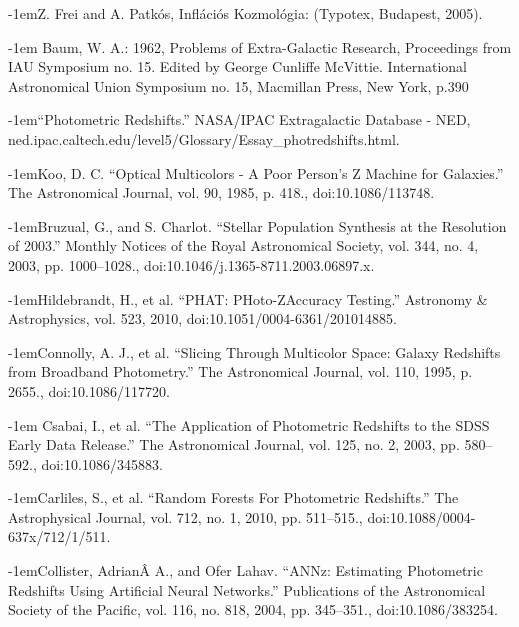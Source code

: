\documentclass[12pt,letterpaper,twoside,openright]{book}
\begin{document}
\begin{thebibliography}{99\kern\bibindent}
\def\bibindent{1em}

\makeatletter
\let\old@biblabel\@biblabel
\def\@biblabel#1{\old@biblabel{#1}\kern\bibindent}
\let\old@bibitem\bibitem
\def\bibitem#1{\old@bibitem{#1}\leavevmode\kern-\bibindent}
\makeatother
{}
Z. Frei and A. Patkós, Inflációs Kozmológia: (Typotex, Budapest, 2005).



 Baum, W. A.: 1962, Problems of Extra-Galactic Research, Proceedings from IAU Symposium no. 15. Edited by George Cunliffe McVittie. International Astronomical Union Symposium no. 15, Macmillan Press, New York, p.390


“Photometric Redshifts.” NASA/IPAC Extragalactic Database - NED, ned.ipac.caltech.edu/level5/Glossary/Essay\_{}photredshifts.html.


Koo, D. C. “Optical Multicolors - A Poor Person's Z Machine for Galaxies.” The Astronomical Journal, vol. 90, 1985, p. 418., doi:10.1086/113748.

Bruzual, G., and S. Charlot. “Stellar Population Synthesis at the Resolution of 2003.” Monthly Notices of the Royal Astronomical Society, vol. 344, no. 4, 2003, pp. 1000–1028., doi:10.1046/j.1365-8711.2003.06897.x.


Hildebrandt, H., et al. “PHAT: PHoto-ZAccuracy Testing.” Astronomy \&{} Astrophysics, vol. 523, 2010, doi:10.1051/0004-6361/201014885.



Connolly, A. J., et al. “Slicing Through Multicolor Space: Galaxy Redshifts from Broadband Photometry.” The Astronomical Journal, vol. 110, 1995, p. 2655., doi:10.1086/117720.

 Csabai, I., et al. “The Application of Photometric Redshifts to the SDSS Early Data Release.” The Astronomical Journal, vol. 125, no. 2, 2003, pp. 580–592., doi:10.1086/345883.

Carliles, S., et al. “Random Forests For Photometric Redshifts.” The Astrophysical Journal, vol. 712, no. 1, 2010, pp. 511–515., doi:10.1088/0004-637x/712/1/511.

Collister, AdrianÂ A., and Ofer Lahav. “ANNz: Estimating Photometric Redshifts Using Artificial Neural Networks.” Publications of the Astronomical Society of the Pacific, vol. 116, no. 818, 2004, pp. 345–351., doi:10.1086/383254.


\end{thebibliography}
\end{document}
